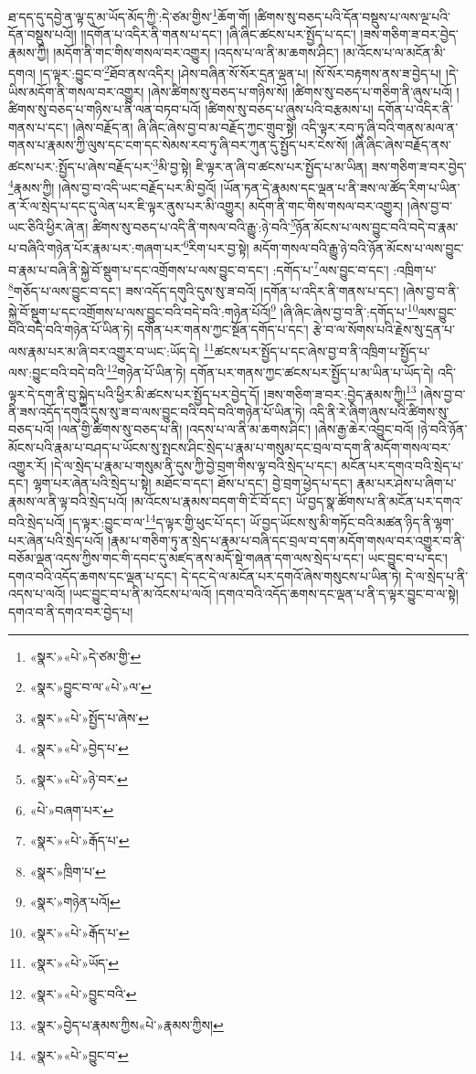 ཐ་དད་དུ་དབྱེ་ན་ལྟ་དུ་མ་ཡོད་མོད་ཀྱི་:དེ་ཙམ་གྱིས་\footnote{«སྣར་»«པེ་»དེ་ཙམ་གྱི་}ཆོག་གོ། །ཚིགས་སུ་བཅད་པའི་དོན་བསྡུས་པ་ལས་ལྔ་པའི་དོན་བསྡུས་པའོ།། །།དགོན་པ་འདིར་ནི་གནས་པ་དང་། །ཞི་ཞིང་ཚངས་པར་སྤྱོད་པ་དང་། །ཟས་གཅིག་ཟ་བར་བྱེད་རྣམས་ཀྱི། །མདོག་ནི་གང་གིས་གསལ་བར་འགྱུར། །འདས་པ་ལ་ནི་མ་ཆགས་ཤིང་། །མ་འོངས་པ་ལ་མངོན་མི་དགའ། །ད་ལྟར་:བྱུང་བ་\footnote{«སྣར་»བྱུང་བ་ལ་«པེ་»ལ་}ཐོབ་ནས་འདིར། །ཤེས་བཞིན་སོ་སོར་དྲན་ལྡན་པ། །སོ་སོར་བརྟགས་ནས་ཟ་བྱེད་པ། །དེ་ཡིས་མདོག་ནི་གསལ་བར་འགྱུར། །ཞེས་ཚིགས་སུ་བཅད་པ་གཉིས་སོ། །ཚིགས་སུ་བཅད་པ་གཅིག་ནི་ཞུས་པའོ། །ཚིགས་སུ་བཅད་པ་གཉིས་པ་ནི་ལན་བཏབ་པའོ། །ཚིགས་སུ་བཅད་པ་ཞུས་པའི་བརྩམས་པ། དགོན་པ་འདིར་ནི་གནས་པ་དང་། །ཞེས་བརྗོད་ན། ཞི་ཞིང་ཞེས་བྱ་བ་མ་བརྗོད་ཀྱང་གྲུབ་སྟེ། འདི་ལྟར་རབ་ཏུ་ཞི་བའི་གནས་མལ་ན་གནས་པ་རྣམས་ཀྱི་ལུས་དང་ངག་དང་སེམས་རབ་ཏུ་ཞི་བར་ཀུན་དུ་སྤྱོད་པར་ངེས་སོ། །ཞི་ཞིང་ཞེས་བརྗོད་ནས་ཚངས་པར་:སྤྱོད་པ་ཞེས་བརྗོད་པར་\footnote{«སྣར་»«པེ་»སྤྱོད་པ་ཞེས་}མི་བྱ་སྟེ། ཇི་ལྟར་ན་ཞི་བ་ཚངས་པར་སྤྱོད་པ་མ་ཡིན། ཟས་གཅིག་ཟ་བར་བྱེད་\footnote{«སྣར་»«པེ་»བྱེད་པ་}རྣམས་ཀྱི། །ཞེས་བྱ་བ་འདི་ཡང་བརྗོད་པར་མི་བྱའོ། །ཡོན་ཏན་དེ་རྣམས་དང་ལྡན་པ་ནི་ཟས་ལ་ཚོད་རིག་པ་ཡིན་ན་རོ་ལ་སྲེད་པ་དང་དུ་ལེན་པར་ཇི་ལྟར་ནུས་པར་མི་འགྱུར། མདོག་ནི་གང་གིས་གསལ་བར་འགྱུར། །ཞེས་བྱ་བ་ཡང་ཅིའི་ཕྱིར་ཞེ་ན། ཚིགས་སུ་བཅད་པ་འདི་ནི་གསལ་བའི་རྒྱུ་:ཉེ་བའི་\footnote{«སྣར་»«པེ་»ཉེ་བར་}ཉོན་མོངས་པ་ལས་བྱུང་བའི་བདེ་བ་རྣམ་པ་བཞིའི་གཉེན་པོར་རྣམ་པར་:གཞག་པར་\footnote{«པེ་»བཞག་པར་}རིག་པར་བྱ་སྟེ། མདོག་གསལ་བའི་རྒྱུ་ཉེ་བའི་ཉོན་མོངས་པ་ལས་བྱུང་བ་རྣམ་པ་བཞི་ནི་སྐྱེ་བོ་སྡུག་པ་དང་འགྲོགས་པ་ལས་བྱུང་བ་དང་། :དགོད་པ་\footnote{«སྣར་»«པེ་»རྒོད་པ་}ལས་བྱུང་བ་དང་། :འཁྲིག་པ་\footnote{«སྣར་»ཁྲིག་པ་}གཅོད་པ་ལས་བྱུང་བ་དང་། ཟས་འདོད་དགུའི་དུས་སུ་ཟ་བའོ། །དགོན་པ་འདིར་ནི་གནས་པ་དང་། །ཞེས་བྱ་བ་ནི་སྐྱེ་བོ་སྡུག་པ་དང་འགྲོགས་པ་ལས་བྱུང་བའི་བདེ་བའི་:གཉེན་པོའོ།\footnote{«སྣར་»གཉེན་པའོ།} །ཞི་ཞིང་ཞེས་བྱ་བ་ནི་:དགོད་པ་\footnote{«སྣར་»«པེ་»རྒོད་པ་}ལས་བྱུང་བའི་བདེ་བའི་གཉེན་པོ་ཡིན་ཏེ། དགོན་པར་གནས་ཀྱང་སྔོན་དགོད་པ་དང་། རྩེ་བ་ལ་སོགས་པའི་རྗེས་སུ་དྲན་པ་ལས་རྣམ་པར་མ་ཞི་བར་འགྱུར་བ་ཡང་:ཡོད་དེ། \footnote{«སྣར་»«པེ་»ཡོད་}ཚངས་པར་སྤྱོད་པ་དང་ཞེས་བྱ་བ་ནི་འཁྲིག་པ་སྤྱོད་པ་ལས་:བྱུང་བའི་བདེ་བའི་\footnote{«སྣར་»«པེ་»བྱུང་བའི་}གཉེན་པོ་ཡིན་ཏེ། དགོན་པར་གནས་ཀྱང་ཚངས་པར་སྤྱོད་པ་མ་ཡིན་པ་ཡོད་དེ། འདི་ལྟར་དེ་དག་ནི་བུ་སྐྱེད་པའི་ཕྱིར་མི་ཚངས་པར་སྤྱོད་པར་བྱེད་དོ། །ཟས་གཅིག་ཟ་བར་:བྱེད་རྣམས་ཀྱི།\footnote{«སྣར་»བྱེད་པ་རྣམས་ཀྱིས«པེ་»རྣམས་ཀྱིས།} །ཞེས་བྱ་བ་ནི་ཟས་འདོད་དགུའི་དུས་སུ་ཟ་བ་ལས་བྱུང་བའི་བདེ་བའི་གཉེན་པོ་ཡིན་ཏེ། འདི་ནི་རེ་ཞིག་ཞུས་པའི་ཚིགས་སུ་བཅད་པའོ། །ལན་གྱི་ཚིགས་སུ་བཅད་པ་ནི། །འདས་པ་ལ་ནི་མ་ཆགས་ཤིང་། །ཞེས་རྒྱ་ཆེར་འབྱུང་བའོ། །ཉེ་བའི་ཉོན་མོངས་པའི་རྣམ་པ་བཤད་པ་ཡོངས་སུ་སྤངས་ཤིང་སྲེད་པ་རྣམ་པ་གསུམ་དང་བྲལ་བ་དག་ནི་མདོག་གསལ་བར་འགྱུར་རོ། །དེ་ལ་སྲེད་པ་རྣམ་པ་གསུམ་ནི་དུས་ཀྱི་བྱེ་བྲག་གིས་ལྟ་བའི་སྲེད་པ་དང་། མངོན་པར་དགའ་བའི་སྲེད་པ་དང་། ལྷག་པར་ཞེན་པའི་སྲེད་པ་སྟེ། མཐོང་བ་དང་། ཐོས་པ་དང་། བྱེ་བྲག་ཕྱེད་པ་དང་། རྣམ་པར་ཤེས་པ་ཞིག་པ་རྣམས་ལ་ནི་ལྟ་བའི་སྲེད་པའོ། །མ་འོངས་པ་རྣམས་བདག་གི་ངོ་བོ་དང་། ཡོ་བྱད་སྣ་ཚོགས་པ་ནི་མངོན་པར་དགའ་བའི་སྲེད་པའོ། །ད་ལྟར་:བྱུང་བ་ལ་\footnote{«སྣར་»«པེ་»བྱུང་བ་}ད་ལྟར་གྱི་ཕུང་པོ་དང་། ཡོ་བྱད་ཡོངས་སུ་མི་གཏོང་བའི་མཚན་ཉིད་ནི་ལྷག་པར་ཞེན་པའི་སྲེད་པའོ། །རྣམ་པ་གཅིག་ཏུ་ན་སྲེད་པ་རྣམ་པ་བཞི་དང་བྲལ་བ་དག་མདོག་གསལ་བར་འགྱུར་བ་ནི་བཅོམ་ལྡན་འདས་ཀྱིས་གང་གི་དབང་དུ་མཛད་ནས་མདོ་སྡེ་གཞན་དག་ལས་སྲེད་པ་དང་། ཡང་བྱུང་བ་པ་དང་། དགའ་བའི་འདོད་ཆགས་དང་ལྡན་པ་དང་། དེ་དང་དེ་ལ་མངོན་པར་དགའོ་ཞེས་གསུངས་པ་ཡིན་ཏེ། དེ་ལ་སྲེད་པ་ནི་འདས་པ་ལའོ། །ཡང་བྱུང་བ་པ་ནི་མ་འོངས་པ་ལའོ། །དགའ་བའི་འདོད་ཆགས་དང་ལྡན་པ་ནི་ད་ལྟར་བྱུང་བ་ལ་སྟེ། དགའ་བ་ནི་དགའ་བར་བྱེད་པ། 